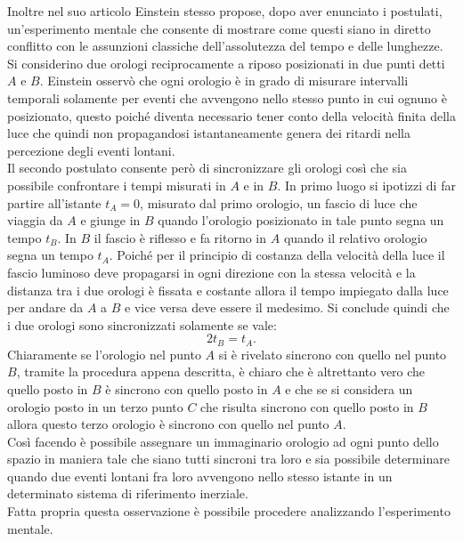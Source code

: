 Inoltre nel suo articolo Einstein stesso propose, dopo aver enunciato i postulati, un'esperimento mentale che consente di mostrare come questi siano in diretto conflitto con le assunzioni classiche dell'assolutezza del tempo e delle lunghezze. Si considerino due orologi reciprocamente a riposo posizionati in due punti detti $A$ e $B$. Einstein osservò che ogni orologio è in grado di misurare intervalli temporali solamente per eventi che avvengono nello stesso punto in cui ognuno è posizionato, questo poiché diventa necessario tener conto della velocità finita della luce che quindi non propagandosi istantaneamente genera dei ritardi nella percezione degli eventi lontani.\\ Il secondo postulato consente però di sincronizzare gli orologi così che sia possibile confrontare i tempi misurati in $A$ e in $B$. In primo luogo si ipotizzi di far partire all'istante $t_A=0$, misurato dal primo orologio, un fascio di luce che viaggia da $A$ e giunge in $B$ quando l'orologio posizionato in tale punto segna un tempo $t_B$. In $B$ il fascio è riflesso e fa ritorno in $A$ quando il relativo orologio segna un tempo $t_A$. Poiché per il principio di costanza della velocità della luce il fascio luminoso deve propagarsi in ogni direzione con la stessa velocità e la distanza tra i due orologi è fissata e costante allora il tempo impiegato dalla luce per andare da $A$ a $B$ e vice versa deve essere il medesimo. Si conclude quindi che i due orologi sono sincronizzati solamente se vale:
\begin{equation}
    2t_B=t_A.
    \label{SinconizazioneOrologi}
\end{equation}
Chiaramente se l'orologio nel punto $A$ si è rivelato sincrono con quello nel punto $B$, tramite la procedura appena descritta, è chiaro che è altrettanto vero che quello posto in $B$ è sincrono con quello posto in $A$ e che se si considera un orologio posto in un terzo punto $C$ che risulta sincrono con quello posto in $B$ allora questo terzo orologio è sincrono con quello nel punto $A$.\\Così facendo è possibile assegnare un immaginario orologio ad ogni punto dello spazio in maniera tale che siano tutti sincroni tra loro e sia possibile determinare quando due eventi lontani fra loro avvengono nello stesso istante in un determinato sistema di riferimento inerziale.\\
Fatta propria questa osservazione è possibile procedere analizzando l'esperimento mentale.
